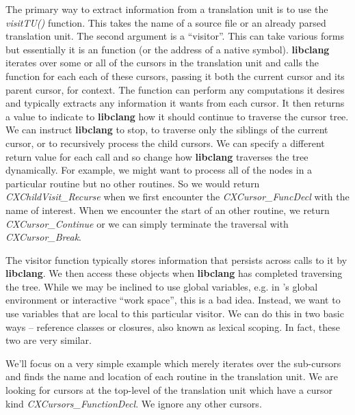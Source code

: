 \documentclass[article]{jss}
\def\R{\proglang{R}}
\def\Rfunc#1{\textsl{#1()}}
\def\Rvar#1{\textsl{#1}}
\def\libclang{\textbf{libclang}}
\begin{document}
The primary way to extract information from a translation unit is to
use the \Rfunc{visitTU} function.  This takes the name of a source
file or an already parsed translation unit.  The second argument is a
``visitor''.  This can take various forms but essentially it is an
\R{} function (or the address of a native symbol).  \libclang{}
iterates over some or all of the cursors in the translation unit and
calls the \R{} function for each each of these cursors, passing it
both the current cursor and its parent cursor, for context.  The
function can perform any computations it desires and typically
extracts any information it wants from each cursor. 
It then returns a
value to indicate to \libclang{} how it should continue to traverse
the cursor tree.  We can instruct \libclang{} to stop, to traverse
only the siblings of the current cursor, or to recursively process the
child cursors.  We can specify a different return value for each call
and so change how \libclang{} traverses the tree dynamically.  For
example, we might want to process all of the nodes in a particular
routine but no other routines. So we would return
\Rvar{CXChildVisit_Recurse} when we first encounter the \Rvar{CXCursor_FuncDecl}%
with the name of interest.  When we encounter the start of an other routine, we return
\Rvar{CXCursor_Continue} or we can simply terminate the traversal with
\Rvar{CXCursor_Break}.

The visitor function typically stores information that persists across
calls to it by \libclang.  We then access these objects when
\libclang{} has completed traversing the tree.  While we may be
inclined to use global variables, e.g. in \R{}'s global environment or
interactive ``work space'', this is a bad idea.  Instead, we want to
use variables that are local to this particular visitor.  We can do
this in two basic ways -- reference classes or closures, also known as
lexical scoping.  In fact, these two are very similar.

We'll focus on a very simple example which merely
iterates over the sub-cursors and finds the name and location of each
routine in the translation unit.  We are looking for cursors at the
top-level of the translation unit which have a cursor kind
\Rvar{CXCursors_FunctionDecl}.  We ignore any other cursors.
\end{document}
